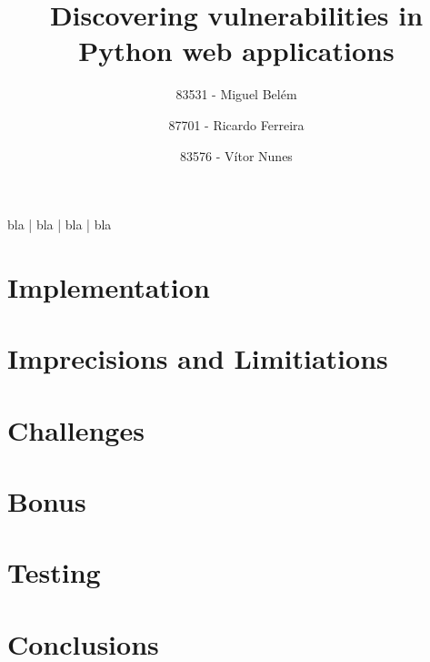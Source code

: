 \documentclass[times, twoside, watermark]{zHenriquesLab-StyleBioRxiv}
\begin{document}
\title{Discovering vulnerabilities in Python web applications}

\author[1,\Letter]{83531 - Miguel Belém}
\author[2,\Letter]{87701 - Ricardo Ferreira}
\author[3,\Letter]{83576 - Vítor Nunes}

\maketitle

\begin{abstract}
\blindtext
\end {abstract}

\begin{keywords}
bla | bla | bla | bla
\end{keywords}

\begin{corrauthor}

\end{corrauthor}

\section*{Implementation}


\section*{Imprecisions and Limitiations}


\section*{Challenges}


\section*{Bonus}


\section*{Testing}

\section*{Conclusions}
\end{document}
